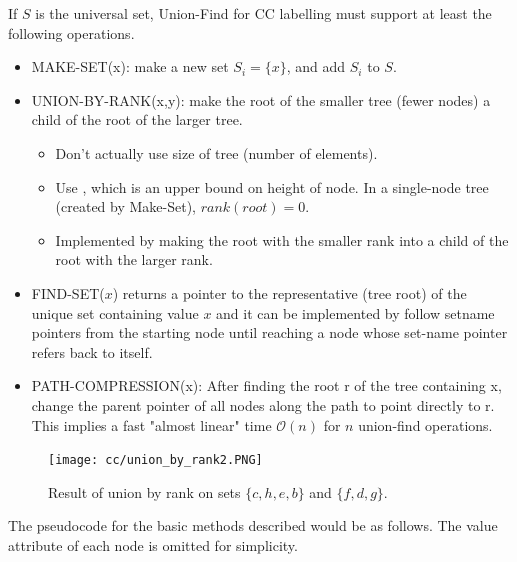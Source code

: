 \documentclass[a4paper]{article}
\begin{document}
If $S$ is the universal set, Union-Find for CC labelling must support at least the following operations.
\begin{itemize}
    \item MAKE-SET(x): make a new set $S_i = \{x\}$, and add $S_i$ to $S$.
    \item UNION-BY-RANK(x,y): make the root of the smaller tree (fewer nodes) a child of the
root of the larger tree.
    \begin{itemize}
        \item Don't actually use size of tree (number of elements).
        \item Use , which is an upper bound on height of node. In a single-node tree (created by Make-Set), $rank(root)=0$.
        \item Implemented by making the root with the smaller rank into a child of the root with the larger rank.
    \end{itemize}
    \item FIND-SET($x$) returns a pointer to the representative (tree root) of the unique set containing value $x$ and it can be implemented by follow setname pointers from the starting node until reaching a node whose set-name pointer refers back to itself.
    \item PATH-COMPRESSION(x): After finding the root r of the tree containing x, change the parent pointer of all nodes along the path to point directly to r. This implies a fast "almost linear" time $\mathcal{O}(n)$ for $n$ union-find operations.
\end{itemize}
\begin{figure}[H]
    \centering
    \texttt{[image: cc/union\_by\_rank2.PNG]}
    \caption{Result of union by rank on sets $\{c,h,e,b\}$ and $\{f,d,g\}$.}
\end{figure}
The pseudocode for the basic methods described would be as follows. The value attribute of each node is omitted for simplicity.

\end{document}

